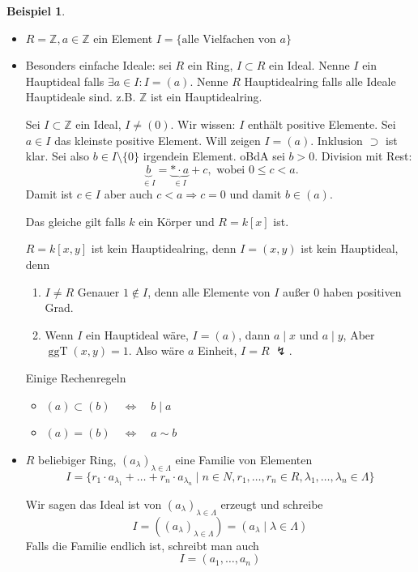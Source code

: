 \documentclass[12pt,parskip=full]{scrartcl}
\newcommand{\setZ}{\mathbb{Z}}
\theoremstyle{definition}
\newtheorem{example}[theorem]{Beispiel}
\theoremstyle{remark}
\begin{document}
	\begin{example}
		\begin{itemize}
			\item $R = \setZ, a \in \setZ$ ein Element $I = \{ \text{alle Vielfachen von $a$} \}$
			\item Besonders einfache Ideale: sei $R$ ein Ring, $I \subset R$ ein Ideal. Nenne $I$ ein Hauptideal falls $\exists a \in I: I = (a)$. Nenne $R$ Hauptidealring falls alle Ideale Hauptideale sind. z.B. $\setZ$ ist ein Hauptidealring.
			
			Sei $I \subset \setZ$ ein Ideal, $I \neq (0)$. Wir wissen: $I$ enthält positive Elemente. Sei $a \in I$ das kleinste positive Element. Will zeigen $I = (a)$. Inklusion $\supset$ ist klar. Sei also $b \in I \setminus \{ 0 \}$ irgendein Element. oBdA sei $b > 0$. Division mit Rest:
			\begin{equation*}
				\underbrace{b}_{\in I} = \underbrace{* \cdot a}_{\in I} + c, \text{ wobei } 0 \leq c < a.
			\end{equation*}
			Damit ist $c \in I$ aber auch $c < a \Rightarrow c = 0$ und damit $b \in (a)$.
			
			Das gleiche gilt falls $k$ ein Körper und $R = k[x]$ ist.
			
			$R = k[x,y]$ ist kein Hauptidealring, denn $I = (x,y)$ ist kein Hauptideal, denn
			\begin{enumerate}
				\item $I \neq R$ Genauer $1 \notin I$, denn alle Elemente von $I$ außer $0$ haben positiven Grad.
				\item Wenn $I$ ein Hauptideal wäre, $I = (a)$, dann $a \mid x$ und $a \mid y$, Aber $\operatorname{ggT}(x,y) = 1$. Also wäre $a$ Einheit, $I = R$ $\lightning$.
			\end{enumerate}
		
			Einige Rechenregeln
			\begin{itemize}
				\item $(a) \subset (b) \quad\Leftrightarrow\quad b \mid a$
				\item $(a) = (b) \quad\Leftrightarrow\quad a \sim b$
			\end{itemize}
						
			\item $R$ beliebiger Ring, $(a_\lambda)_{\lambda \in \Lambda}$ eine Familie von Elementen
			\begin{equation*}
				I = \{ r_1 \cdot a_{\lambda_1} + \dots + r_n \cdot a_{\lambda_n} \mid n \in N, r_1, \dots, r_n \in R, \lambda_1, \dots, \lambda_n \in \Lambda \}
			\end{equation*}
			
			Wir sagen das Ideal ist von $(a_\lambda)_{\lambda \in \Lambda}$ erzeugt und schreibe
			\begin{equation*}
				I = ((a_\lambda)_{\lambda \in \Lambda}) = (a_\lambda \mid \lambda \in \Lambda)
			\end{equation*}
			Falls die Familie endlich ist, schreibt man auch
			\begin{equation*}
				I = (a_1, \dots, a_n)
			\end{equation*}
		\end{itemize}
	\end{example}
\end{document}
